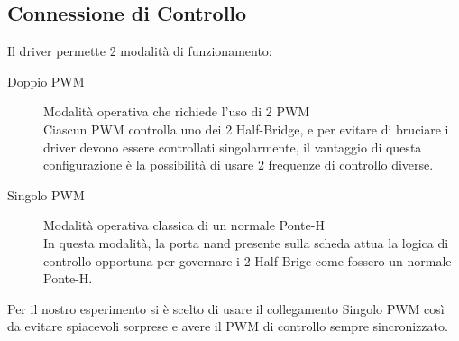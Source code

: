 \subsection{Connessione di Controllo}
Il driver permette 2 modalità di funzionamento:
\begin{description}
	\item[Doppio PWM] Modalità operativa che richiede l'uso di 2 PWM\\
	      Ciascun PWM controlla uno dei 2 Half-Bridge, e per evitare di bruciare i driver devono essere controllati singolarmente, il vantaggio di questa configurazione è la possibilità di usare 2 frequenze di controllo diverse.
	\item[Singolo PWM] Modalità operativa classica di un normale Ponte-H\\
	      In questa modalità, la porta nand presente sulla scheda attua la logica di controllo opportuna per governare i 2 Half-Brige come fossero un normale Ponte-H.
\end{description}

\noindent
Per il nostro esperimento si è scelto di usare il collegamento Singolo PWM così da evitare spiacevoli sorprese e avere il PWM di controllo sempre sincronizzato.	

\newpage
